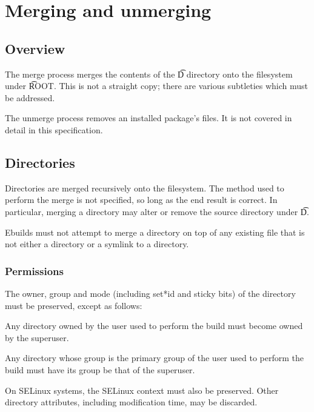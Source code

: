 \chapter{Merging and unmerging}


\section{Overview}

The merge process merges the contents of the \t{D} directory onto the filesystem under \t{ROOT}\@.
This is not a straight copy; there are various subtleties which must be addressed.

The unmerge process removes an installed package's files. It is not covered in detail in this
specification.

\section{Directories}

Directories are merged recursively onto the filesystem. The method used to perform the merge is not
specified, so long as the end result is correct. In particular, merging a directory may alter or
remove the source directory under \t{D}.

Ebuilds must not attempt to merge a directory on top of any existing file that is not either a
directory or a symlink to a directory.

\subsection{Permissions}

The owner, group and mode (including set*id and sticky bits) of the directory must be preserved,
except as follows:

\begin{compactitem}
\item Any directory owned by the user used to perform the build must become owned by the superuser.
\item Any directory whose group is the primary group of the user used to perform the build must have
    its group be that of the superuser.
\end{compactitem}

On SELinux systems, the SELinux context must also be preserved. Other directory attributes,
including modification time, may be discarded.

